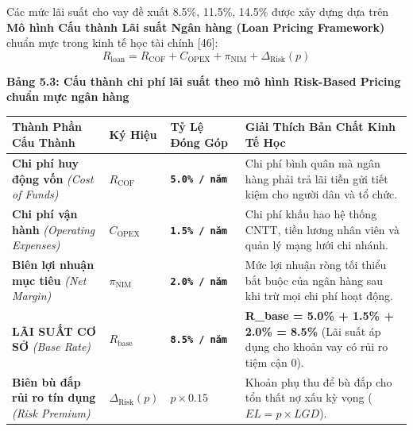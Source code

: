 \documentclass[
  13pt,
  a4paper,
]{report}
\newcounter{none} %
\begin{document}
Các mức lãi suất cho vay đề xuất 8.5\%, 11.5\%, 14.5\% được xây dựng dựa
trên \textbf{Mô hình Cấu thành Lãi suất Ngân hàng (Loan Pricing
Framework)} chuẩn mực trong kinh tế học tài chính {[}46{]}:
\[R_{\text{loan}} = R_{\text{COF}} + C_{\text{OPEX}} + \pi_{\text{NIM}} + \Delta_{\text{Risk}}(p)\]

\textbf{Bảng 5.3: Cấu thành chi phí lãi suất theo mô hình Risk-Based
Pricing chuẩn mực ngân hàng}

{\def\LTcaptype{none} %
\begin{longtable}[]{@{}
  >{\raggedright\arraybackslash}p{}
  >{\centering\arraybackslash}p{}
  >{\centering\arraybackslash}p{}
  >{\raggedright\arraybackslash}p{}@{}}
\toprule\noalign{}
\begin{minipage}[b]{\linewidth}\raggedright
Thành Phần Cấu Thành
\end{minipage} & \begin{minipage}[b]{\linewidth}\centering
Ký Hiệu
\end{minipage} & \begin{minipage}[b]{\linewidth}\centering
Tỷ Lệ Đóng Góp
\end{minipage} & \begin{minipage}[b]{\linewidth}\raggedright
Giải Thích Bản Chất Kinh Tế Học
\end{minipage} \\
\midrule\noalign{}
\endhead
\bottomrule\noalign{}
\endlastfoot
\textbf{Chi phí huy động vốn} \emph{(Cost of Funds)} &
\(R_{\text{COF}}\) & \textbf{\texttt{5.0\%\ /\ năm}} & Chi phí bình quân
mà ngân hàng phải trả lãi tiền gửi tiết kiệm cho người dân và tổ
chức. \\
\textbf{Chi phí vận hành} \emph{(Operating Expenses)} &
\(C_{\text{OPEX}}\) & \textbf{\texttt{1.5\%\ /\ năm}} & Chi phí khấu hao
hệ thống CNTT, tiền lương nhân viên và quản lý mạng lưới chi nhánh. \\
\textbf{Biên lợi nhuận mục tiêu} \emph{(Net Margin)} &
\(\pi_{\text{NIM}}\) & \textbf{\texttt{2.0\%\ /\ năm}} & Mức lợi nhuận
ròng tối thiểu bắt buộc của ngân hàng sau khi trừ mọi chi phí hoạt
động. \\
\textbf{LÃI SUẤT CƠ SỞ} \emph{(Base Rate)} & \(R_{\text{base}}\) &
\textbf{\texttt{8.5\%\ /\ năm}} & \textbf{R\_base = 5.0\% + 1.5\% +
2.0\% = 8.5\%} (Lãi suất áp dụng cho khoản vay có rủi ro tiệm cận 0). \\
\textbf{Biên bù đắp rủi ro tín dụng} \emph{(Risk Premium)} &
\(\Delta_{\text{Risk}}(p)\) & \(p \times 0.15\) & Khoản phụ thu để bù
đắp cho tổn thất nợ xấu kỳ vọng (\(EL = p \times LGD\)). \\
\end{longtable}
}
\end{document}
